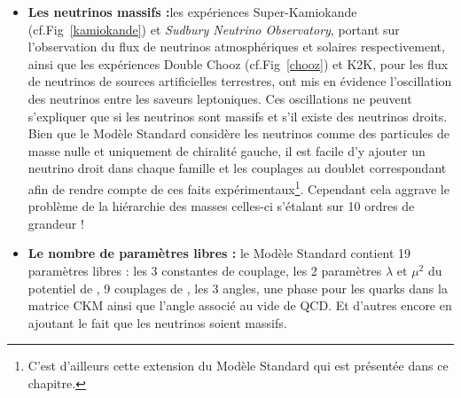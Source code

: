 \begin{itemize}[label=$\bullet$]
\item \textbf{Les neutrinos massifs :}les expériences Super-Kamiokande (cf.Fig~\ref{kamiokande}) et \textit{Sudbury Neutrino Observatory}, portant sur l'observation du flux de neutrinos atmosphériques et solaires respectivement, ainsi que les expériences Double Chooz (cf.Fig~\ref{chooz}) et K2K, pour les flux de neutrinos de sources artificielles terrestres, ont mis en évidence l'oscillation des neutrinos entre les saveurs leptoniques. Ces oscillations ne peuvent s'expliquer que si les neutrinos sont massifs et s'il existe des neutrinos droits. Bien que le Modèle Standard considère les neutrinos comme des particules de masse nulle et uniquement de chiralité gauche, il est facile d'y ajouter un neutrino droit dans chaque famille et les couplages au doublet  correspondant afin de rendre compte de ces faits expérimentaux\footnote{C'est d'ailleurs cette extension du Modèle Standard qui est présentée dans ce chapitre.}. Cependant cela aggrave le problème de la hiérarchie des masses celles-ci s'étalant sur \num{10} ordres de grandeur !

\item \textbf{Le nombre de paramètres libres :} le Modèle Standard contient \num{19} paramètres libres : les \num{3} constantes de couplage, les \num{2} paramètres $\lambda$ et $\mu^2$ du potentiel de , \num{9} couplages de , les \num{3} angles, une phase pour les quarks dans la matrice CKM ainsi que l'angle associé au vide de QCD. Et d'autres encore en ajoutant le fait que les neutrinos soient massifs.


\end{itemize}
